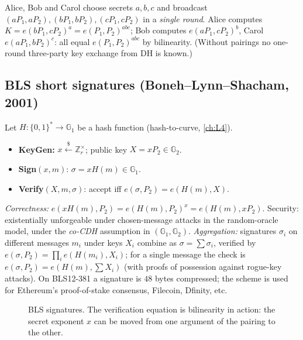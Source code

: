\documentclass[11pt,a4paper,oneside]{book}
\theoremstyle{plain}
\theoremstyle{definition}
\theoremstyle{remark}
\newcommand{\Z}{\mathbb{Z}}
\newcommand{\sample}{\xleftarrow{\$}}
\begin{document}
Alice, Bob and Carol choose secrets $a,b,c$ and broadcast $(aP_1,aP_2),(bP_1,bP_2),(cP_1,cP_2)$ in a \emph{single round}. Alice computes $K=e(bP_1,cP_2)^a=e(P_1,P_2)^{abc}$; Bob computes $e(aP_1,cP_2)^b$, Carol $e(aP_1,bP_2)^c$: all equal $e(P_1,P_2)^{abc}$ by bilinearity. (Without pairings no one-round three-party key exchange from DH is known.)

\subsection{BLS short signatures (Boneh--Lynn--Shacham, 2001)}

Let $H:\{0,1\}^*\to\mathbb G_1$ be a hash function (hash-to-curve, \cref{ch:L4}).
\begin{itemize}[nosep]
\item \textbf{KeyGen:} $x\sample\Z_r^\times$; public key $X=xP_2\in\mathbb G_2$.
\item \textbf{Sign}$(x,m)$: $\sigma=xH(m)\in\mathbb G_1$.
\item \textbf{Verify}$(X,m,\sigma)$: accept iff $e(\sigma,P_2)=e(H(m),X)$.
\end{itemize}
\emph{Correctness:} $e(xH(m),P_2)=e(H(m),P_2)^x=e(H(m),xP_2)$. Security: existentially unforgeable under chosen-message attacks in the random-oracle model, under the \emph{co-CDH} assumption in $(\mathbb G_1,\mathbb G_2)$.
\emph{Aggregation:} signatures $\sigma_i$ on different messages $m_i$ under keys $X_i$ combine as $\sigma=\sum\sigma_i$, verified by $e(\sigma,P_2)=\prod_ie(H(m_i),X_i)$; for a single message the check is $e(\sigma,P_2)=e(H(m),\sum X_i)$ (with proofs of possession against rogue-key attacks). On BLS12-381 a signature is $48$ bytes compressed; the scheme is used for Ethereum's proof-of-stake consensus, Filecoin, Dfinity, etc.

\begin{figure}[ht]
\centering
{}
\caption{BLS signatures. The verification equation is bilinearity in action: the secret exponent $x$ can be moved from one argument of the pairing to the other.}
\end{figure}
\end{document}
